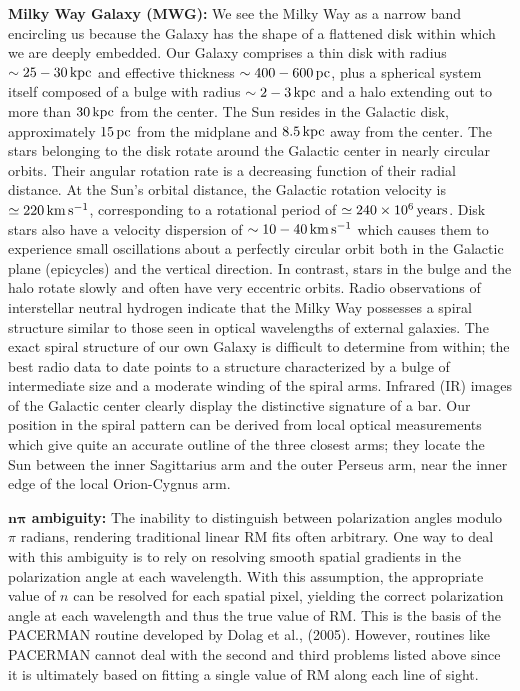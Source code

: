 \documentclass[a4paper,11pt]{article}
\begin{document}
{\noindent}\textbf{Milky Way Galaxy (MWG):} We see the Milky Way as a narrow band encircling us because the Galaxy has the shape of a flattened disk within which we are deeply embedded. Our Galaxy comprises a thin disk with radius $\sim25-30\,{\rm kpc}$ and effective thickness $\sim400-600\,{\rm pc}$, plus a spherical system itself composed of a bulge with radius $\sim2-3\,{\rm kpc}$ and a halo extending out to more than $30\,{\rm kpc}$ from the center. The Sun resides in the Galactic disk, approximately $15\,{\rm pc}$ from the midplane and $8.5\,{\rm kpc}$ away from the center. The stars belonging to the disk rotate around the Galactic center in nearly circular orbits. Their angular rotation rate is a decreasing function of their radial distance. At the Sun's orbital distance, the Galactic rotation velocity is $\simeq220\,{\rm km\,s^{-1}}$, corresponding to a rotational period of $\simeq240\times10^6\,{\rm years}$. Disk stars also have a velocity dispersion of $\sim10-40\,{\rm km\,s^{-1}}$ which causes them to experience small oscillations about a perfectly circular orbit both in the Galactic plane (epicycles) and the vertical direction. In contrast, stars in the bulge and the halo rotate slowly and often have very eccentric orbits. Radio observations of interstellar neutral hydrogen indicate that the Milky Way possesses a spiral structure similar to those seen in optical wavelengths of external galaxies. The exact spiral structure of our own Galaxy is difficult to determine from within; the best radio data to date points to a structure characterized by a bulge of intermediate size and a moderate winding of the spiral arms. Infrared (IR) images of the Galactic center clearly display the distinctive signature of a bar. Our position in the spiral pattern can be derived from local optical measurements which give quite an accurate outline of the three closest arms; they locate the Sun between the inner Sagittarius arm and the outer Perseus arm, near the inner edge of the local Orion-Cygnus arm.

{\noindent}\textbf{$\mathbf{n\pi}$ ambiguity:} The inability to distinguish between polarization angles modulo $\pi$ radians, rendering traditional linear RM fits often arbitrary. One way to deal with this ambiguity is to rely on resolving smooth spatial gradients in the polarization angle at each wavelength. With this assumption, the appropriate value of $n$ can be resolved for each spatial pixel, yielding the correct polarization angle at each wavelength and thus the true value of RM. This is the basis of the PACERMAN routine developed by Dolag et al., (2005). However, routines like PACERMAN cannot deal with the second and third problems listed above since it is ultimately based on fitting a single value of RM along each line of sight. 
\end{document}
